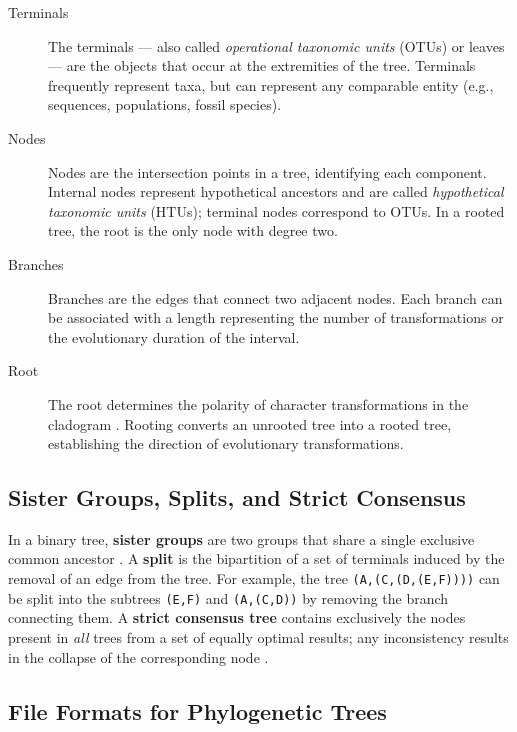\begin{description}
    \item[Terminals] The terminals --- also called \textit{operational taxonomic units} (OTUs) or leaves --- are the objects that occur at the extremities of the tree. Terminals frequently represent taxa, but can represent any comparable entity (e.g., sequences, populations, fossil species).

    \item[Nodes] Nodes are the intersection points in a tree, identifying each component. Internal nodes represent hypothetical ancestors and are called \textit{hypothetical taxonomic units} (HTUs); terminal nodes correspond to OTUs. In a rooted tree, the root is the only node with degree two.

    \item[Branches] Branches are the edges that connect two adjacent nodes. Each branch can be associated with a length representing the number of transformations or the evolutionary duration of the interval.

    \item[Root] The root determines the polarity of character transformations in the cladogram \parencite{schuh2009}. Rooting converts an unrooted tree into a rooted tree, establishing the direction of evolutionary transformations.
\end{description}

\subsection{Sister Groups, Splits, and Strict Consensus}

In a binary tree, \textbf{sister groups} are two groups that share a single exclusive common ancestor \parencite{schuh2009}. A \textbf{split} is the bipartition of a set of terminals induced by the removal of an edge from the tree. For example, the tree \texttt{(A,(C,(D,(E,F))))} can be split into the subtrees \texttt{(E,F)} and \texttt{(A,(C,D))} by removing the branch connecting them. A \textbf{strict consensus tree} contains exclusively the nodes present in \emph{all} trees from a set of equally optimal results; any inconsistency results in the collapse of the corresponding node \parencite{schuh2009}.

\subsection{File Formats for Phylogenetic Trees}

